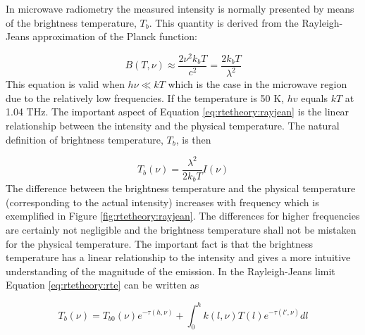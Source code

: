  In microwave radiometry the measured intensity is normally presented
 by means of the brightness temperature, $T_b$. This quantity is
 derived from the Rayleigh-Jeans approximation of the Planck function:

 \begin{equation}
   B(T,\nu) \approx \frac{2\nu^2k_bT}{c^2} = \frac{2k_bT}{\lambda^2}
  \label{eq:rtetheory:rayjean}
 \end{equation}  
 This equation is valid when $h\nu \ll kT$ which is the case in the
 microwave region due to the relatively low frequencies. If the
 temperature is 50 K, $hv$ equals $kT$ at 1.04 THz. The important
 aspect of Equation \ref{eq:rtetheory:rayjean} is the linear relationship
 between the intensity and the physical temperature. The natural
 definition of brightness temperature, $T_b$, is then

 \begin{equation}
   T_b(\nu) = \frac{\lambda^2}{2k_bT} I(\nu)
  \label{eq:rtetheory:tb}
 \end{equation}  
 The difference between the brightness temperature and the physical
 temperature (corresponding to the actual intensity) increases with
 frequency which is exemplified in Figure \ref{fig:rtetheory:rayjean}. The
 differences for higher frequencies are certainly not negligible and
 the brightness temperature shall not be mistaken for the physical
 temperature. The important fact is that the brightness temperature
 has a linear relationship to the intensity and gives a more intuitive
 understanding of the magnitude of the emission. In the Rayleigh-Jeans
 limit Equation \ref{eq:rtetheory:rte} can be written as

 \begin{equation}
   T_b(\nu) = T_{b0}(\nu)e^{-\tau(h,\nu)} + 
     \int^h_0{k(l,\nu)T(l) e^{-\tau(l',\nu)} dl}
  \label{eq:rtetheory:rte_tb}
 \end{equation}  

